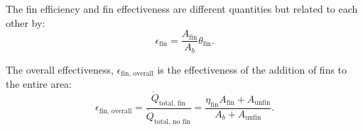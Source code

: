 The fin efficiency and fin effectiveness are different quantities but related to each other by:
\begin{equation*}
  \epsilon_{\text{fin}} = \frac{A_{\text{fin}}}{A_b} \theta_{\text{fin}}
.\end{equation*}

The overall effectiveness, $\epsilon_{\text{fin, overall}}$ is the effectiveness of the addition of fins to the entire area:
\begin{equation*}
  \epsilon_{\text{fin, overall}} = \frac{\dot{Q}_{\text{total, fin}}}{\dot{Q}_{\text{total, no fin}}} = \frac{\eta_{\text{fin}} A_{\text{fin}} + A_{\text{unfin}}}{A_b + A_{\text{unfin}}}
.\end{equation*}

